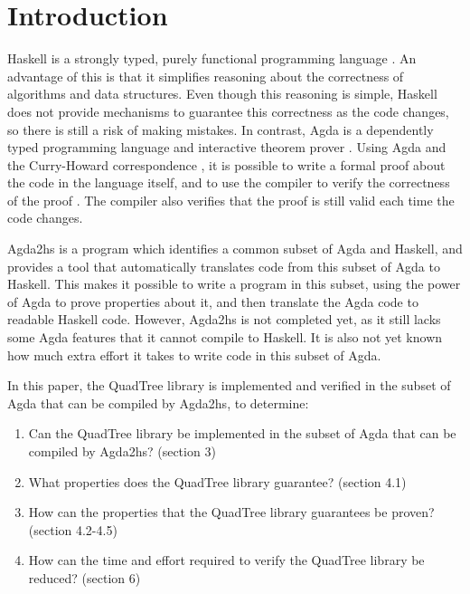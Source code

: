 \section{Introduction}
Haskell is a strongly typed, purely functional programming language \cite{haskell}. An advantage of this is that it simplifies reasoning about the correctness of algorithms and data structures. Even though this reasoning is simple, Haskell does not provide mechanisms to guarantee this correctness as the code changes, so there is still a risk of making mistakes. In contrast, Agda is a dependently typed programming language and interactive theorem prover \cite{agda}.  Using Agda and the Curry-Howard correspondence \cite{chc}, it is possible to write a formal proof about the code in the language itself, and to use the compiler to verify the correctness of the proof \cite{schwaab, van}. The compiler also verifies that the proof is still valid each time the code changes.

Agda2hs \cite{agda2hs} is a program which identifies a common subset of Agda and Haskell, and provides a tool that automatically translates code from this subset of Agda to Haskell. This makes it possible to write a program in this subset, using the power of Agda to prove properties about it, and then translate the Agda code to readable Haskell code. However, Agda2hs is not completed yet, as it still lacks some Agda features that it cannot compile to Haskell. It is also not yet known how much extra effort it takes to write code in this subset of Agda.

In this paper, the QuadTree library is implemented and verified in the subset of Agda that can be compiled by Agda2hs, to determine:
\begin{enumerate}[label=(\roman*)]
	\itemsep-0.2em 
	\item Can the QuadTree library be implemented in the subset of Agda that can be compiled by Agda2hs? (section 3)
	\item What properties does the QuadTree library guarantee? (section 4.1)
	\item How can the properties that the QuadTree library guarantees be proven? (section 4.2-4.5)
	\item How can the time and effort required to verify the QuadTree library be reduced? (section 6)
\end{enumerate}
